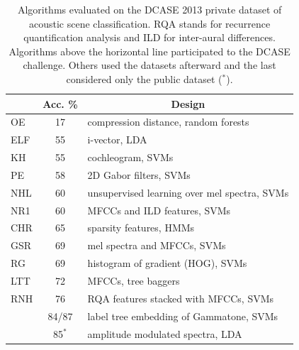 \documentclass[journal]{IEEEtran}
\newcommand{\gl}[1]{\textcolor{red}{Gr\'egoire : #1}}
\begin{document}
\begin{table}
\begin{center}
\caption{Algorithms evaluated on the DCASE 2013 private dataset of acoustic scene classification. RQA stands for recurrence quantification analysis and ILD for inter-aural differences. Algorithms above the horizontal line participated to the DCASE challenge. Others used the datasets afterward and the last considered only the public dataset ($^*$).  \label{tab:dcase}}
\begin{tabular}{lcl}
& Acc. \%  &  \multicolumn{1}{c}{Design}  \\
\hline
\cite{olivetti2013wonder} OE & 17 & compression distance, random forests \\
\cite{elizalde2013vector} ELF & 55 & i-vector, LDA \\
\cite{krijnders2013tone} KH & 55 & cochleogram, SVMs \\
\cite{patil2013multiresolution} PE & 58 & 2D Gabor filters, SVMs \\
\cite{lee2013acoustic} NHL & 60 & unsupervised learning over mel spectra, SVMs \\
\cite{nogueira2013sound} NR1 & 60 & MFCCs and ILD features, SVMs \\
\cite{chum2013ieee} CHR & 65 & sparsity features, HMMs  \\
\cite{geiger2013large} GSR & 69 & mel spectra and MFCCs, SVMs \\
\cite{rakotomamonjy2015histogram} RG & 69 & histogram of gradient (HOG), SVMs \\
\cite{li2013auditory} LTT & 72 & MFCCs, tree baggers \\
\cite{roma2013recurrence} RNH & 76 & RQA features stacked with MFCCs, SVMs \\
\hline
\cite{phan2016label} & 84/87 & label tree embedding of Gammatone, SVMs \\
\cite{7362846} & 85$^*$ & amplitude modulated spectra, LDA \\
\end{tabular}
\end{center}
\end{table}


\end{document}
